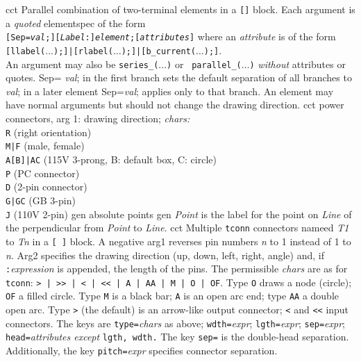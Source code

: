 %

%
  {cct}%
  { Parallel combination of two-terminal elements in a {\tt []} block.
    Each argument is a {\em quoted} elementspec of the form\\
    {\tt[Sep={\sl val};][{\sl Label}:]{\sl element};[{\sl attributes}]} where
    an {\sl attribute} is of the form\\
    {\tt[llabel($\ldots$);]|[rlabel($\ldots$);]|[b\_current($\ldots$);]}.\\
    An argument may also be {\tt series\_($\ldots$)} or {\tt
    parallel\_($\ldots$)} {\em without} attributes or quotes.  Sep={\sl
    val}; in the first branch sets the default separation of all branches
    to {\sl val}; in a later element Sep={\sl val}; applies only to
    that branch.  An element may have normal arguments but should not
    change the drawing direction.
   }%
%
  {cct}%
  {power connectors, arg 1: drawing direction; {\sl chars:}\\
   {\tt R} (right orientation)\\
   {\tt M|F} (male, female)\\
   {\tt A[B]|AC} (115V 3-prong, B: default box, C: circle)\\
   {\tt P} (PC connector)\\
   {\tt D} (2-pin connector)\\
   {\tt G|GC} (GB 3-pin)\\
   {\tt J} (110V 2-pin)
    }%
%
  {gen}%
  {absolute points}%
%
  {gen}%
  {{\sl Point} is the label for the point on {\sl Line} of the
  perpendicular
   from {\sl Point} to {\sl Line}.}%
%
  {cct}%
  { Multiple {\tt tconn} connectors nameed {\sl T1} to {\sl Tn} in a {\tt [ ]}
    block.
    A negative arg1 reverses pin numbers {\sl n} to 1 instead of 1 to {\sl n}.
   Arg2 specifies the drawing direction (up, down, left, right, angle) and,
   if {\tt :}{\sl expression} is appended, the length of the pins. 
   The permissible {\sl chars} are as for {\tt tconn}:
   {\tt > | >{}> | < | <{}< | A | AA | M | O | OF}.
   Type {\tt O} draws a node (circle); {\tt OF} a filled circle.
   Type {\tt M} is a black bar; {\tt A} is an open arc end; type {\tt AA}
   a double open arc.  Type {\tt >} (the default) is an arrow-like output
   connector; {\tt <} and {\tt <{}<} input connectors.
   The keys are {\tt type=}{\sl chars} as above;
   {\tt wdth=}{\sl expr}; {\tt lgth=}{\sl expr}; {\tt sep=}{\sl expr};
   {\tt head=}{\sl attributes except} {\tt lgth, wdth.}
   The key {\tt sep=} is the double-head separation.
   Additionally, the key {\tt pitch=}{\sl expr} specifies connector
   separation.
    }%
